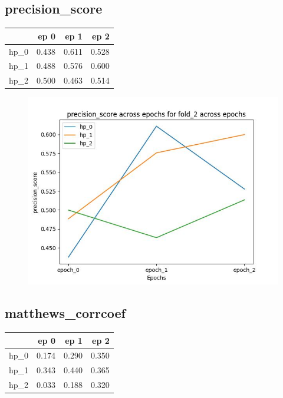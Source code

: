 \documentclass{article}
\begin{document}
\subsection{precision\_score}
\begin{tabular}{lrrr}
\toprule
{} &   ep 0 &   ep 1 &   ep 2 \\
\midrule
hp\_0 &  0.438 &  0.611 &  0.528 \\
hp\_1 &  0.488 &  0.576 &  0.600 \\
hp\_2 &  0.500 &  0.463 &  0.514 \\
\bottomrule
\end{tabular}

\begin{figure}[H]
\includegraphics[scale = 0.75]{fold_2/precision_score}
\end{figure}
\subsection{matthews\_corrcoef}
\begin{tabular}{lrrr}
\toprule
{} &   ep 0 &   ep 1 &   ep 2 \\
\midrule
hp\_0 &  0.174 &  0.290 &  0.350 \\
hp\_1 &  0.343 &  0.440 &  0.365 \\
hp\_2 &  0.033 &  0.188 &  0.320 \\
\bottomrule
\end{tabular}
\end{document}
